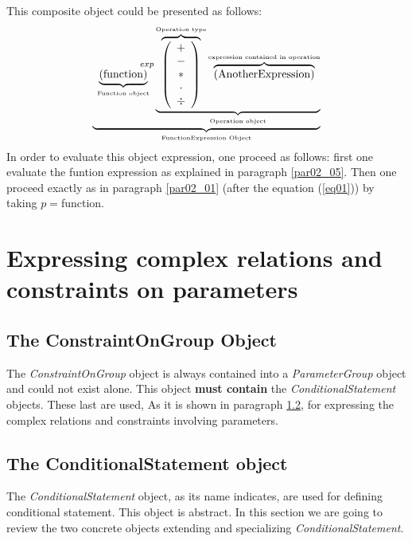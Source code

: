 \documentclass[a4paper,11pt] {article}
\begin{document}
This composite object could be presented as follows:
\begin{equation}
 \underbrace{    \underbrace{ \left(\mbox{function}\right) }_{\mbox{\tiny Function object}} ^{\hspace{15mm}exp} \underbrace{  \overbrace{\left( \begin{array}{c} + \\ - \\ \ast  \\ \cdot \\ \div   \end{array} \right) }^{\mbox{\tiny Operation type}}
 \overbrace{    \left( \mbox{AnotherExpression}\right) }^{\mbox{\tiny expression contained in operation}}   }_{\mbox{\tiny Operation object}}}_{\mbox{\tiny FunctionExpression Object}}
\end{equation}
In order to evaluate this object expression, one proceed as follows: first one evaluate the funtion expression as explained in paragraph  \ref{par02_05}. Then one proceed exactly as in paragraph \ref{par02_01} (after the equation (\ref{eq01})) by taking $p=$function.



\section{Expressing complex relations and constraints on parameters} 

\subsection{The ConstraintOnGroup Object}\label{par-ConstraintsOnGroup}
The {\it  ConstraintOnGroup} object is always contained into a {\it ParameterGroup} object and could not exist alone. 
This object {\bf must contain} the {\it ConditionalStatement} objects. These last are used, As it is shown in paragraph \ref{par-ConditionalStatement}, for expressing the complex relations and constraints involving parameters.

\subsection{The ConditionalStatement object}\label{par-ConditionalStatement}
The {\it ConditionalStatement} object, as its name indicates, are used for defining conditional statement. This object is abstract. In this section we are going to review the two concrete objects extending and specializing  {\it ConditionalStatement}. 
\end{document}

